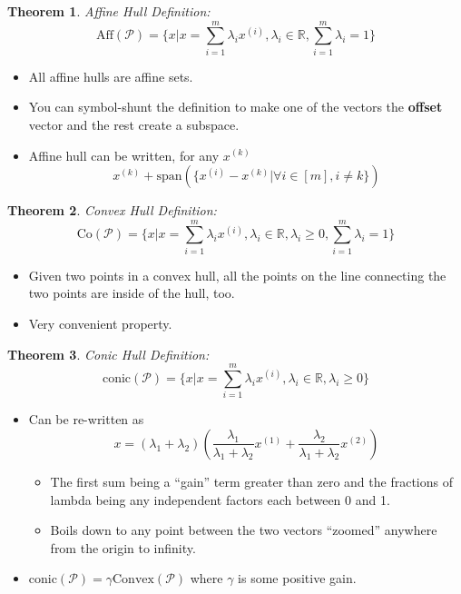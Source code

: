 \documentclass[a4paper,12pt]{report}
\newtheorem{theorem}{Theorem}
\begin{document}
\begin{theorem}{Affine Hull Definition: }
\begin{equation}
\text{Aff}(\mathcal{P}) = \{x | x = \sum_{i = 1}^{m} \lambda_i x^{(i)}, \lambda_i \in \mathbb{R}, \sum_{i=1}^{m} \lambda_i = 1 \}
\end{equation}
\end{theorem}
\begin{itemize}
\item All affine hulls are affine sets. 
\item You can symbol-shunt the definition to make one of the vectors the \textbf{offset} vector and the rest create a subspace.
\item Affine hull can be written, for any $x^{(k)}$
\begin{equation}
x^{(k)} + \text{span}(\{x^{(i)} - x^{(k)} | \forall i\in [m], i \neq k\})
\end{equation}
\end{itemize}


\begin{theorem}{Convex Hull Definition: }
\begin{equation}
\text{Co}(\mathcal{P}) = \{x | x = \sum_{i = 1}^{m} \lambda_i x^{(i)}, \lambda_i \in \mathbb{R}, \lambda_i \geq 0, \sum_{i=1}^{m} \lambda_i = 1 \}
\end{equation}
\end{theorem}

\begin{itemize}
\item Given two points in a convex hull, all the points on the line connecting the two points are inside of the hull, too.
\item Very convenient property.
\end{itemize}


\begin{theorem}{Conic Hull Definition: }
\begin{equation}
\text{conic}(\mathcal{P}) = \{x | x = \sum_{i = 1}^{m} \lambda_i x^{(i)}, \lambda_i \in \mathbb{R}, \lambda_i \geq 0 \}
\end{equation}
\end{theorem}

\begin{itemize}
\item Can be re-written as 
\begin{equation}
x = (\lambda_1 + \lambda_2)(\frac{\lambda_1}{\lambda_1 + \lambda_2} x^{(1)} + \frac{\lambda_2}{\lambda_1 + \lambda_2} x^{(2)})
\end{equation}
\begin{itemize}
\item The first sum being a ``gain'' term greater than zero and the fractions of lambda being any independent factors each between 0 and 1.
\item Boils down to any point between the two vectors ``zoomed'' anywhere from the origin to infinity.
\end{itemize}
\item $\text{conic}(\mathcal P) = \gamma \text{Convex}(\mathcal P)$ where $\gamma$ is some positive gain.
\end{itemize}
\end{document}
